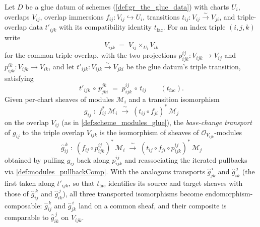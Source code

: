 \begin{lemma}
  \label{lem:modules_pullback_basechange_transport}
  Let \(D\) be a glue datum of schemes (\cref{def:gr_the_glue_data}) with charts
  \(U_i\), overlaps \(V_{ij}\), overlap immersions \(f_{ij} : V_{ij} \hookrightarrow
  U_i\), transitions \(t_{ij} : V_{ij} \xrightarrow{\sim} V_{ji}\), and triple-overlap
  data \(t'_{ijk}\) with its compatibility identity \(t_{\mathrm{fac}}\). For an index
  triple \((i,j,k)\) write
  \[
    V_{ijk} \;=\; V_{ij} \times_{U_i} V_{ik}
  \]
  for the common triple overlap, with the two projections
  \(p^{ij}_{ijk} : V_{ijk} \to V_{ij}\) and \(p^{ik}_{ijk} : V_{ijk} \to V_{ik}\), and
  let \(t'_{ijk} : V_{ijk} \xrightarrow{\sim} V_{jki}\) be the glue datum's triple
  transition, satisfying
  \[
    t'_{ijk} \,\circ\, p^{jk}_{jki} \;=\; p^{ij}_{ijk} \,\circ\, t_{ij}
    \qquad (t_{\mathrm{fac}}).
  \]
  Given per-chart sheaves of modules \(\mathcal{M}_i\) and a transition isomorphism
  \[
    g_{ij} \;:\; f_{ij}^{*}\,\mathcal{M}_i
      \;\xrightarrow{\ \sim\ }\;
    (t_{ij} \circ f_{ji})^{*}\,\mathcal{M}_j
  \]
  on the overlap \(V_{ij}\) (as in \cref{def:scheme_modules_glue}), the
  \emph{base-change transport} of \(g_{ij}\) to the triple overlap \(V_{ijk}\) is the
  isomorphism of sheaves of \(\mathcal{O}_{V_{ijk}}\)-modules
  \[
    \widehat{g}_{ij}^{\,k}
      \;:\;
    (f_{ij} \circ p^{ij}_{ijk})^{*}\,\mathcal{M}_i
      \;\xrightarrow{\ \sim\ }\;
    (t_{ij} \circ f_{ji} \circ p^{ij}_{ijk})^{*}\,\mathcal{M}_j
  \]
  obtained by pulling \(g_{ij}\) back along \(p^{ij}_{ijk}\) and reassociating the
  iterated pullbacks via \cref{def:modules_pullbackComp}. With the analogous transports
  \(\widehat{g}_{jk}^{\,i}\) and \(\widehat{g}_{ik}^{\,j}\) (the first taken along
  \(t'_{ijk}\), so that \(t_{\mathrm{fac}}\) identifies its source and target sheaves
  with those of \(\widehat{g}_{ij}^{\,k}\) and \(\widehat{g}_{ik}^{\,j}\)), all three
  transported isomorphisms become endomorphism-composable: \(\widehat{g}_{ij}^{\,k}\)
  and \(\widehat{g}_{jk}^{\,i}\) land on a common sheaf, and their composite is
  comparable to \(\widehat{g}_{ik}^{\,j}\) on \(V_{ijk}\).
\end{lemma}


